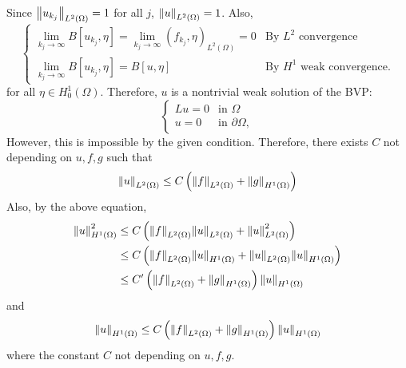 \documentclass{article}
\begin{document}
Since $\norm{u_{k_j}}_{L^2(\Omega)}=1$ for all $j$, $\norm{u}_{L^2(\Omega)}=1$. Also,
\begin{equation*}
\begin{cases}
\lim\limits_{k_j\rightarrow \infty}B[u_{k_j},\eta]=\lim\limits_{k_j\rightarrow \infty}(f_{k_j},\eta)_{L^2(\Omega)}=0 & \text{By }L^2\text{ convergence} \\
\lim\limits_{k_j\rightarrow \infty}B[u_{k_j},\eta]=B[u,\eta] & \text{By }H^1\text{ weak convergence}.
\end{cases}
\end{equation*}
for all $\eta\in H^1_0(\Omega)$. Therefore, $u$ is a nontrivial weak solution of the BVP:
\begin{equation*}
\begin{cases}
Lu=0 & \text{in }\Omega \\
u=0 & \text{in }\partial \Omega,
\end{cases}
\end{equation*}
However, this is impossible by the given condition. Therefore, there exists $C$ not depending on $u, f, g$ such that
\begin{equation*}
\norm{u}_{L^2(\Omega)}\leq C\left(\norm{f}_{L^2(\Omega)}+\norm{g}_{H^1(\Omega)}\right)
\end{equation*}
Also, by the above equation,
\begin{equation*}
\begin{split}
\norm{u}^2_{H^1(\Omega)}&\leq C\left(\norm{f}_{L^2(\Omega)}\norm{u}_{L^2(\Omega)}+\norm{u}^2_{L^2(\Omega)}\right) \\
&\leq C\left(\norm{f}_{L^2(\Omega)}\norm{u}_{H^1(\Omega)}+\norm{u}_{L^2(\Omega)}\norm{u}_{H^1(\Omega)}\right) \\
&\leq C'\left(\norm{f}_{L^2(\Omega)}+\norm{g}_{H^1(\Omega)}\right)\norm{u}_{H^1(\Omega)}
\end{split}
\end{equation*}
and
\begin{equation*}
\norm{u}_{H^1(\Omega)}\leq C\left(\norm{f}_{L^2(\Omega)}+\norm{g}_{H^1(\Omega)}\right)\norm{u}_{H^1(\Omega)}
\end{equation*}
where the constant $C$ not depending on $u,f,g$.
\end{document}

